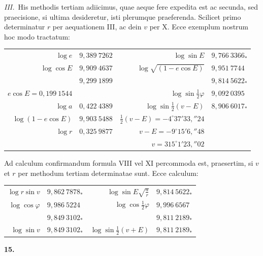 \documentclass[12pt,a4paper]{book}
\begin{document}
\textit{III.}\ His methodis tertiam adiicimus, quae aeque fere expedita est ac secunda, sed praecisione, si ultima desideretur, isti plerumque praeferenda. Scilicet primo determinatur $r$ per aequationem III, ac dein $v$ per X. Ecce exemplum nostrum hoc modo tractatum:

\begin{center}
\begin{tabular}{@{}r@{\quad}l@{\quad}|@{\quad}r@{\quad}l@{}}
$\log e$ & $9{,}389\ 7262$ & $\log\sin E$ & $9{,}766\ 3366_{*}$ \\
$\log\cos E$ & $9{,}909\ 4637$ & $\log\sqrt{(1-e\cos E)}$ & $9{,}951\ 7744$ \\
& $9{,}299\ 1899$ & & $9{,}814\ 5622_{*}$ \\
$e\cos E=0{,}199\ 1544$ & & $\log\sin\tfrac{1}{2}\varphi$ & $9{,}092\ 0395$ \\
$\log a$ & $0{,}422\ 4389$ & $\log\sin\tfrac{1}{2}(v-E)$ & $8{,}906\ 6017_{*}$ \\
$\log(1-e\cos E)$ & $9{,}903\ 5488$ & $\tfrac{1}{2}(v-E)=-4^{\circ}37'33{,}''24$ \\
$\log r$ & $0{,}325\ 9877$ & $v-E=-9^{\circ}15'6{,}''48$ \\
& & $v=315^{\circ}1'23{,}''02$
\end{tabular}
\end{center}

Ad calculum confirmandum formula VIII vel XI percommoda est, praesertim, si $v$ et $r$ per methodum tertiam determinatae sunt. Ecce calculum:

\begin{center}
\begin{tabular}{@{}r@{\quad}l@{\quad}|@{\quad}r@{\quad}l@{}}
$\log r\sin v$ & $9{,}862\ 7878_{*}$ & $\log\sin E\sqrt{\frac{a}{r}}$ & $9{,}814\ 5622_{*}$ \\
$\log\cos\varphi$ & $9{,}986\ 5224$ & $\log\cos\tfrac{1}{2}\varphi$ & $9{,}996\ 6567$ \\
& $9{,}849\ 3102_{*}$ & & $9{,}811\ 2189_{*}$ \\
$\log\sin v$ & $9{,}849\ 3102_{*}$ & $\log\sin\tfrac{1}{2}(v+E)$ & $9{,}811\ 2189_{*}$
\end{tabular}
\end{center}

\textbf{15.}
\end{document}
